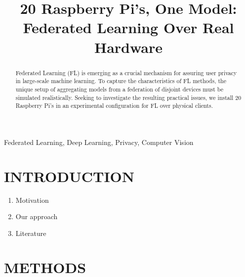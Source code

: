 \documentclass{article}
\title{20 Raspberry Pi's, One Model: Federated Learning Over Real Hardware}
\begin{document}
%

\maketitle
%
\begin{abstract}
    Federated Learning (FL) is emerging as a crucial mechanism for assuring user privacy in large-scale machine learning.
    To capture the characteristics of FL methods, the unique setup of aggregating models from a federation of disjoint devices must be simulated realistically.
    Seeking to investigate the resulting practical issues, we install 20 Raspberry Pi's in an experimental configuration for FL over physical clients.
\end{abstract}
%
\begin{keywords}
    Federated Learning, Deep Learning, Privacy, Computer Vision
\end{keywords}

\section{INTRODUCTION}
\label{sec:intro}
\cite{kai2021advances}
\begin{enumerate}
    \item Motivation
    \item Our approach
    \item Literature
\end{enumerate}


\section{METHODS}%
\label{sec:methods}
\end{document}

